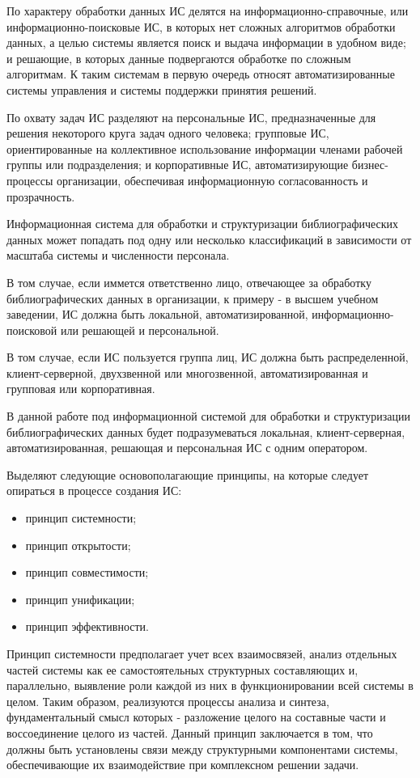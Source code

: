 По характеру обработки данных ИС делятся на информационно-справочные, или информационно-поисковые ИС, в которых нет сложных алгоритмов обработки данных, а целью системы является поиск и выдача информации в удобном виде; и решающие, в которых данные подвергаются обработке по сложным алгоритмам. К таким системам в первую очередь относят автоматизированные системы управления и системы поддержки принятия решений.

По охвату задач ИС разделяют на персональные ИС, предназначенные для решения некоторого круга задач одного человека; групповые ИС, ориентированные на коллективное использование информации членами рабочей группы или подразделения; и корпоративные ИС, автоматизирующие бизнес-процессы организации, обеспечивая информационную согласованность и прозрачность.

Информационная система для обработки и структуризации библиографических данных может попадать под одну или несколько классификаций в зависимости от масштаба системы и численности персонала.

В том случае, если иммется ответственно лицо, отвечающее за обработку библиографических данных в организации, к примеру - в высшем учебном заведении, ИС должна быть локальной, автоматизированной, информационно-поисковой или решающей и персональной.

В том случае, если ИС пользуется группа лиц, ИС должна быть распределенной, клиент-серверной, двухзвенной или многозвенной, автоматизированная и групповая или корпоративная.

В данной работе под информационной системой для обработки и структуризации библиографических данных будет подразумеваться локальная, клиент-серверная, автоматизированная, решающая и персональная ИС с одним оператором. 

Выделяют следующие основополагающие принципы, на которые следует опираться в процессе создания ИС:

\begin{itemize}
	\item принцип системности;
	\item принцип открытости;
	\item принцип совместимости;
	\item принцип унификации;
	\item принцип эффективности.
\end{itemize}

Принцип системности предполагает учет всех взаимосвязей, анализ отдельных частей системы как ее самостоятельных структурных составляющих и, параллельно, выявление роли каждой из них в функционировании всей системы в целом. Таким образом, реализуются процессы анализа и синтеза, фундаментальный смысл которых - разложение целого на составные части и воссоединение целого из частей. Данный принцип заключается в том, что должны быть установлены связи между структурными компонентами системы, обеспечивающие их взаимодействие при комплексном решении задачи.

